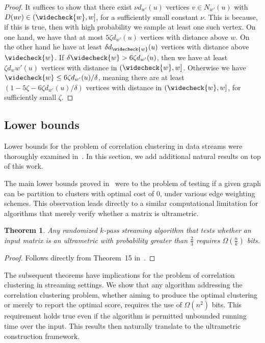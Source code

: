 \documentclass{article}
\newtheorem{theorem}{Theorem}
\begin{document}
\begin{proof}
It suffices to show that there exist $\nu d_{w'}(u)$ vertices $v \in N_{w'}(u)$ with $D(uv) \in (\widecheck{w},w]$, for a sufficiently small constant $\nu$.
This is because, if this is true, then with high probability we sample at least one such vertex.
On one hand, we have that at most $5\zeta d_{w'}(u)$ vertices with distance above $w$.
On the other hand he have at least $\delta d_{\widecheck{w}}(u)$ vertices with distance above $\widecheck{w}$.
If $\delta \widecheck{w} > 6\zeta d_{w'}(u)$, then we have at least $\zeta d_w{w'}(u)$ vertices with distance in $(\widecheck{w},w]$.
Otherwise we have $\widecheck{w} \le 6\zeta d_{w'}(u) / \delta$, meaning there are at least $(1-5\zeta - 6\zeta d_{w'}(u) / \delta)$ vertices with distance in $(\widecheck{w},w]$, for sufficiently small $\zeta$.
\end{proof}

\subsection{Lower bounds} \label{section:LowerBounds}

Lower bounds for the problem of correlation clustering in data streams were thoroughly examined in~\cite{ahn2021correlation}. In this section, we add additional natural results on top of this work.

The main lower bounds proved in~\cite{ahn2021correlation} were to the problem of testing if a given graph can be partition to clusters with optimal cost of $0$, under various edge weighting schemes. This observation leads directly to a similar computational limitation for algorithms that merely verify whether a matrix is ultrametric.
                          
\begin{theorem}
    Any randomized $k$-pass streaming algorithm that tests whether an input matrix is an ultrametric with probability greater than $\frac{2}{3}$ requires $\Omega(\frac{n}{k})$ bits.
\end{theorem}

\begin{proof}
Follows directly from Theorem~15 in~\cite{ahn2021correlation}.
\end{proof}

The subsequent theorems have implications for the problem of correlation clustering in streaming settings. We show that any algorithm addressing the correlation clustering problem, whether aiming to produce the optimal clustering or merely to report the optimal score, requires the use of $\Omega (n^2)$ bits. This requirement holds true even if the algorithm is permitted unbounded running time over the input. This results then naturally translate to the ultrametric construction framework.
\end{document}

